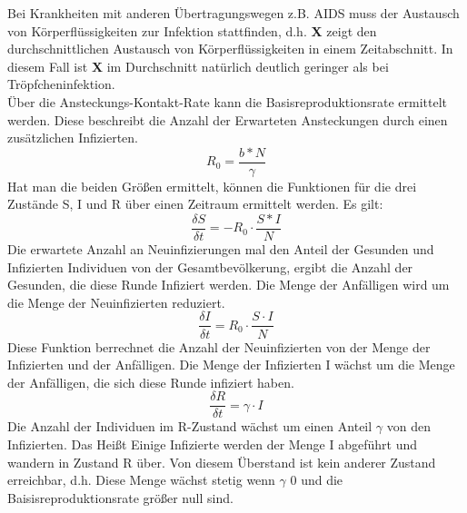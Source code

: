 Bei Krankheiten mit anderen Übertragungswegen z.B. AIDS muss der Austausch von Körperflüssigkeiten zur Infektion stattfinden, d.h. \textbf{X} zeigt den durchschnittlichen Austausch von Körperflüssigkeiten in einem Zeitabschnitt. In diesem Fall ist \textbf{X} im Durchschnitt natürlich deutlich geringer als bei Tröpfcheninfektion.\\
Über die Ansteckungs-Kontakt-Rate kann die Basisreproduktionsrate ermittelt werden. Diese beschreibt die Anzahl der Erwarteten Ansteckungen durch einen zusätzlichen Infizierten.
\begin{equation}
R_0 = \frac{ b * N }{ \gamma }
\end{equation}
Hat man die beiden Größen ermittelt, können die Funktionen für die drei Zustände S, I und R über einen Zeitraum ermittelt werden. 
Es gilt:
\begin{equation}
\frac{ \delta S }{ \delta t } = -R_0 \cdot \frac{S * I}{N}
\end{equation}
Die erwartete Anzahl an Neuinfizierungen mal den Anteil der Gesunden und Infizierten Individuen von der Gesamtbevölkerung, ergibt die Anzahl der Gesunden, die diese Runde Infiziert werden. Die Menge der Anfälligen wird um die Menge der Neuinfizierten reduziert.
\begin{equation}
\frac{\delta I }{\delta t} = R_0 \cdot \frac{S \cdot I}{N}
\end{equation}
Diese Funktion berrechnet die Anzahl der Neuinfizierten von der Menge der Infizierten und der Anfälligen. Die Menge der Infizierten I wächst um die Menge der Anfälligen, die sich diese Runde infiziert haben.
\begin{equation}
\frac{\delta R }{\delta t} = \gamma \cdot I
\end{equation}
Die Anzahl der Individuen im R-Zustand wächst um einen Anteil $\gamma$ von den Infizierten. Das Heißt Einige Infizierte werden der Menge I abgeführt und wandern in Zustand R über. Von diesem Überstand ist kein anderer Zustand erreichbar, d.h. Diese Menge wächst stetig wenn $\gamma$ 0 und die Baisisreproduktionsrate größer null sind.

